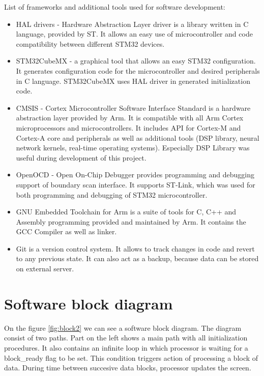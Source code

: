 \documentclass[a4paper,twoside,12pt]{book}
\begin{document}
List of frameworks and additional tools used for software development:

\begin{itemize}
    \item HAL drivers
    - Hardware Abstraction Layer driver is a library written in C language, provided by ST.
    It allows an easy use of microcontroller and code compatibility between different STM32 devices.
    \cite{ST:HAL}
    \item STM32CubeMX
    - a graphical tool that allows an easy STM32 configuration.
    It generates configuration code for the microcontroller and desired peripherals in C language.
    STM32CubeMX uses HAL driver in generated initialization code.
    \item CMSIS
    - Cortex Microcontroller Software Interface Standard
    is a hardware abstraction layer provided by Arm.
    It is compatible with all Arm Cortex microprocessors and microcontrollers.
    It includes API for Cortex-M and Cortex-A core and peripherals as well as additional tools
    (DSP library, neural network kernels, real-time operating systems).
    Especially DSP Library was useful during development of this project.
    \cite{CMSIS_DSP}
    \item OpenOCD
    - Open On-Chip Debugger provides programming and debugging support of boundary scan interface.
    It supports ST-Link, which was used for both programming and debugging of STM32 microcontroller.
    \item GNU Embedded Toolchain for Arm
    is a suite of tools for C, C++ and Assembly programming provided and maintained by Arm.
    It contains the GCC Compiler as well as linker.
    \item Git
    is a version control system. It allows to track changes in code
    and revert to any previous state.
    It can also act as a backup, because data can be stored on external server.
\end{itemize}

\section{Software block diagram}
On the figure \ref{fig:block2} we can see a software block diagram.
The diagram consist of two paths.
Part on the left shows a main path with all initialization procedures.
It also contains an infinite loop in which processor is waiting
for a block\_ready flag to be set.
This condition triggers action of processing a block of data.
During time between succesive data blocks,
processor updates the screen.
\end{document}
